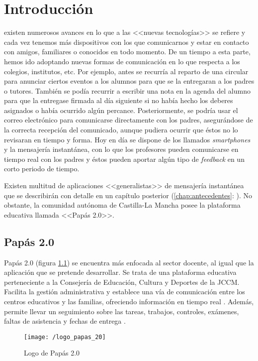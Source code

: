 \chapter{Introducción}
 existen numerosos avances en lo que a las <<nuevas tecnologías>> se refiere y cada vez tenemos más dispositivos con los que comunicarnos y estar en contacto con amigos, familiares o conocidos en todo momento. De un tiempo a esta parte, hemos ido adoptando nuevas formas de comunicación en lo que respecta a los colegios, institutos, etc. Por ejemplo, antes se recurría al reparto de una circular para anunciar ciertos eventos a los alumnos para que se la entregaran a los padres o tutores. También se podía recurrir a escribir una nota en la agenda del alumno para que la entregase firmada al día siguiente si no había hecho los deberes asignados o había ocurrido algún percance. Posteriormente, se podría usar el correo electrónico para comunicarse directamente con los padres, asegurándose de la correcta recepción del comunicado, aunque pudiera ocurrir que éstos no lo revisaran en tiempo y forma. Hoy en día se dispone de los llamados \textit{smartphones} y la mensajería instantánea, con lo que los profesores pueden comunicarse en tiempo real con los padres y éstos pueden aportar algún tipo de \textit{feedback} en un corto periodo de tiempo.

Existen multitud de aplicaciones <<generalistas>> de mensajería instantánea que se describirán con detalle en un capítulo posterior (\ref{chap:antecedentes}: ). No obstante, la comunidad autónoma de Castilla-La Mancha posee la plataforma educativa llamada <<Papás 2.0>>.

\section*{Papás 2.0}

Papás 2.0 (figura \ref{fig:papas20}) se encuentra más enfocada al sector docente, al igual que la aplicación que se pretende desarrollar. Se trata de una plataforma educativa perteneciente a la Consejería de Educación, Cultura y Deportes de la \acf{JCCM}. Facilita la gestión administrativa y establece una vía de comunicación entre los centros educativos y las familias, ofreciendo información en tiempo real \cite{JCCM2017}. Además, permite llevar un seguimiento sobre las tareas, trabajos, controles, exámenes, faltas de asistencia y fechas de entrega \cite{JCCM2010}.

\begin{figure}[!h]
	\begin{center}
		\texttt{[image: /logo\_papas\_20]}
		\caption{Logo de Papás 2.0}
		\label{fig:papas20}
	\end{center}
\end{figure}

